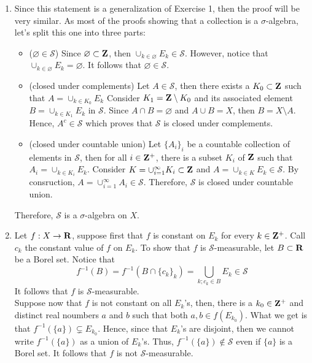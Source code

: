 \begin{solution}
    \begin{enumerate}[label = (\alph*)]
        \item Since this statement is a generalization of Exercise 1, then the proof will be very similar. As most of the proofs showing that a collection is a $\sigma$-algebra, let's split this one into three parts:
        \begin{itemize}
            \item ($\varnothing \in \mathcal{S}$) Since $\varnothing \subset \mathbf{Z}$, then $\cup_{k \in \varnothing}E_k \in \mathcal{S}$. However, notice that $\cup_{k \in \varnothing}E_k = \varnothing$. It follows that $\varnothing \in \mathcal{S}$.
            \item (closed under complements) Let $A \in \mathcal{S}$, then there exists a $K_0 \subset \mathbf{Z}$ such that $A = \cup_{k \in K_0}E_k$
            Consider $K_1 = \mathbf{Z} \setminus K_0$ and its associated element $B = \cup_{k \in K_1}E_k$ in $\mathcal{S}$. Since $A \cap B = \varnothing$ and $A \cup B = X$, then $B = X \setminus A$. Hence, $A^c \in \mathcal{S}$ which proves that $\mathcal{S}$ is closed under complements.
            \item (closed under countable union) Let $\{A_i\}_i$ be a countable collection of elements in $\mathcal{S}$, then for all $i \in \mathbf{Z}^+$, there is a subset $K_i$ of $\mathbf{Z}$ such that $A_i = \cup_{k \in K_i}E_k$. Consider $K = \cup_{i=1}^{\infty}K_i \subset \mathbf{Z}$ and $A = \cup_{k \in K}E_k \in \mathcal{S}$. By consruction, $A = \cup_{i=1}^{\infty}A_i \in \mathcal{S}$. Therefore, $\mathcal{S}$ is closed under countable union.
        \end{itemize}
        Therefore, $\mathcal{S}$ is a $\sigma$-algebra on $X$.
        \item Let $f : X \to \mathbf{R}$, suppose first that $f$ is constant on $E_k$ for every $k \in \mathbf{Z}^+$. Call $c_k$ the constant value of $f$ on $E_k$. To show that $f$ is $\mathcal{S}$-measurable, let $B \subset \mathbf{R}$ be a Borel set. Notice that
        $$f^{-1}(B) = f^{-1}(B \cap \{c_k\}_k) = \bigcup_{k; c_k \in B}E_k  \in \mathcal{S}$$
        It follows that $f$ is $\mathcal{S}$-measurable. \\
        Suppose now that $f$ is not constant on all $E_k$'s, then, there is a $k_0 \in \mathbf{Z}^+$ and distinct real noumbers $a$ and $b$ such that both $a,b \in f(E_{k_0})$. What we get is that $f^{-1}(\{a\}) \subsetneq E_{k_0}$. Hence, since that $E_k$'s are disjoint, then we cannot write $f^{-1}(\{a\})$ as a union of $E_k$'s. Thus, $f^{-1}(\{a\}) \notin \mathcal{S}$ even if $\{a\}$ is a Borel set. It follows that $f$ is not $\mathcal{S}$-measurable. \\
    \end{enumerate}
\end{solution}

